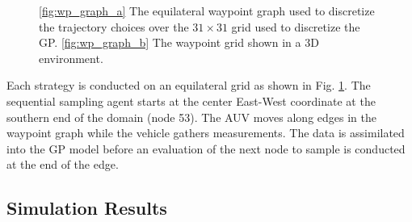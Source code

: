 \documentclass[aoas]{imsart}
\begin{document}
\begin{figure}[!h] 
\centering 
{}
\hfill
{}
\caption{\ref{fig:wp_graph_a} The equilateral waypoint graph used to discretize the
trajectory choices over the $31\times31$ grid used to discretize the GP.
\ref{fig:wp_graph_b} The waypoint grid shown in a 3D environment.}
\label{fig:wp_graph}
\end{figure}

Each strategy is conducted on an equilateral grid as shown in
Fig. \ref{fig:wp_graph}. The sequential sampling agent starts at the
center East-West coordinate at the southern end of the domain (node
53). The AUV moves along edges in the waypoint graph while the vehicle
gathers measurements. The data is assimilated into the GP model before
an evaluation of the next node to sample is conducted at the end of
the edge.

\subsection{Simulation Results}
\end{document}
